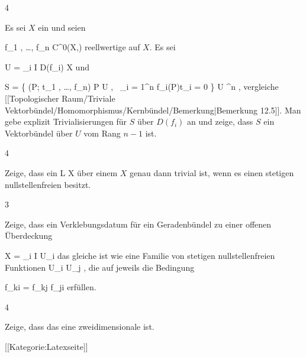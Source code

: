 
{4}
{

Es sei $X$ ein
und seien

\mavergleichskette
{\vergleichskette
{ f_1 , \ldots , f_n
}
{ \in }{ C^0(X,\R)
}
{  }{
}
{    }{
}
{   }{
}
}
{}{}{}
reellwertige
auf $X$. Es sei

\mavergleichskette
{\vergleichskette
{ U
}
{ = }{ \bigcup_{i \in I} D(f_i)
}
{ \subseteq }{ X
}
{    }{
}
{   }{
}
}
{}{}{}
und

\mavergleichskettedisp
{\vergleichskette
{ S
}
{ =} { \left\{ (P; t_1 , \ldots , f_n)  \mid  P \in U , \,  \sum_{i = 1}^n f_i(P)t_i = 0       \right\}
}
{ \subseteq} { U \times \R^n
}
{ } {
}
{ } {
}
}
{}{}{,}
vergleiche
[[Topologischer Raum/Triviale Vektorbündel/Homomorphismus/Kernbündel/Bemerkung|Bemerkung 12.5]].
Man gebe explizit Trivialisierungen für $S$ über $D(f_i)$ an und zeige, dass $S$ ein Vektorbündel über $U$ vom Rang $n-1$ ist.

}
{} {}

{4}
{

Zeige, dass ein
\maabb {} { L } { X
} {}
über einem
$X$ genau dann trivial ist, wenn es einen stetigen nullstellenfreien
besitzt.

}
{} {}

{3}
{

Zeige, dass ein Verklebungsdatum für ein Geradenbündel zu einer offenen Überdeckung

\mavergleichskette
{\vergleichskette
{X
}
{ = }{ \bigcup_{i \in I} U_i
}
{  }{
}
{    }{
}
{   }{
}
}
{}{}{}
das gleiche ist wie eine Familie von stetigen nullstellenfreien Funktionen
 {U_i \cap U_j } { \R
} {,}
die auf
 jeweils die Bedingung

\mavergleichskette
{\vergleichskette
{ f_{ki}
}
{ = }{ f_{kj} \cdot f_{ji}
}
{  }{
}
{    }{
}
{   }{
}
}
{}{}{}
erfüllen.

}
{} {}

{4}
{

Zeige, dass das
eine zweidimensionale
ist.

}
{} {}

 [[Kategorie:Latexseite]]
